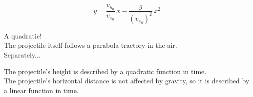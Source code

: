 \documentclass{ximera}
\begin{document}
\[  y = \frac{v_{y_0}}{v_{x_0}} \, x  - \frac{g}{(v_{x_0})^2} \, x^2 \]



A quadratic! \\

The projectile itself follows a parabola tractory in the air. \\


Separately...


The projectile's height is described by a quadratic function in time. \\


The projectile's horizontal distance is not affected by gravity, so it is described by a linear function in time. \\
\end{document}
